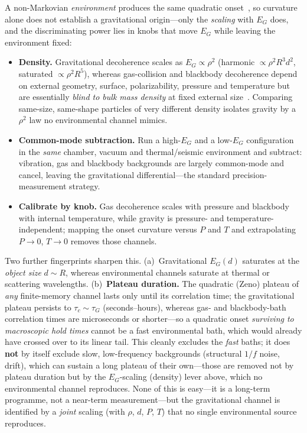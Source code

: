 \documentclass[aps,prd,onecolumn,amsmath,amssymb,nofootinbib,superscriptaddress]{revtex4-2}
\begin{document}
A non-Markovian \emph{environment} produces the same quadratic onset~\cite{R16}, so curvature alone
does not establish a gravitational origin---only the \emph{scaling} with $E_G$ does, and the
discriminating power lies in knobs that move $E_G$ while leaving the environment fixed:
\begin{itemize}
\item \textbf{Density.} Gravitational decoherence scales as $E_G\propto\rho^2$ (harmonic
$\propto\rho^2 R^3 d^2$, saturated $\propto\rho^2 R^5$), whereas gas-collision and blackbody
decoherence depend on external geometry, surface, polarizability, pressure and temperature but are
essentially \emph{blind to bulk mass density} at fixed external size~\cite{R16}. Comparing same-size,
same-shape particles of very different density isolates gravity by a $\rho^2$ law no environmental
channel mimics.
\item \textbf{Common-mode subtraction.} Run a high-$E_G$ and a low-$E_G$ configuration in the
\emph{same} chamber, vacuum and thermal/seismic environment and subtract: vibration, gas and blackbody
backgrounds are largely common-mode and cancel, leaving the gravitational differential---the standard
precision-measurement strategy.
\item \textbf{Calibrate by knob.} Gas decoherence scales with pressure and blackbody with internal
temperature, while gravity is pressure- and temperature-independent; mapping the onset curvature
versus $P$ and $T$ and extrapolating $P\to0$, $T\to0$ removes those channels.
\end{itemize}
Two further fingerprints sharpen this. (a)~Gravitational $E_G(d)$ saturates at the \emph{object size}
$d\sim R$, whereas environmental channels saturate at thermal or scattering wavelengths.
(b)~\textbf{Plateau duration.} The quadratic (Zeno) plateau of \emph{any} finite-memory channel lasts
only until its correlation time; the gravitational plateau persists to $\tau_c\sim\tau_G$
(seconds--hours), whereas gas- and blackbody-bath correlation times are microseconds or shorter---so a
quadratic onset \emph{surviving to macroscopic hold times} cannot be a fast environmental bath, which
would already have crossed over to its linear tail. This cleanly excludes the \emph{fast} baths; it
does \textbf{not} by itself exclude slow, low-frequency backgrounds (structural $1/f$ noise, drift),
which can sustain a long plateau of their own---those are removed not by plateau duration but by the
$E_G$-scaling (density) lever above, which no environmental channel reproduces. None of this is easy---it is a long-term programme, not a near-term
measurement---but the gravitational channel is identified by a \emph{joint} scaling (with $\rho$, $d$,
$P$, $T$) that no single environmental source reproduces.
\end{document}
